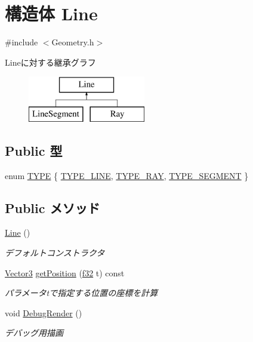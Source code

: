 \hypertarget{struct_line}{\section{構造体 Line}
\label{struct_line}
}


{\ttfamily \#include $<$Geometry.\-h$>$}

Lineに対する継承グラフ\begin{figure}[H]
\begin{center}
\leavevmode
\includegraphics[height=2.000000cm]{d2/d9d/struct_line}
\end{center}
\end{figure}
\subsection*{Public 型}
\begin{DoxyCompactItemize}
\item 
enum \hyperlink{struct_line_a3ccf0fa7d4f1e4b84271568934a65191}{T\-Y\-P\-E} \{ \hyperlink{struct_line_a3ccf0fa7d4f1e4b84271568934a65191abdda39926b9d3ae8c74cd75bf022e4b4}{T\-Y\-P\-E\-\_\-\-L\-I\-N\-E}, 
\hyperlink{struct_line_a3ccf0fa7d4f1e4b84271568934a65191a180d078e39ee948b847638e7e6ca1412}{T\-Y\-P\-E\-\_\-\-R\-A\-Y}, 
\hyperlink{struct_line_a3ccf0fa7d4f1e4b84271568934a65191a132da67b5b3509a5d72a61a664091247}{T\-Y\-P\-E\-\_\-\-S\-E\-G\-M\-E\-N\-T}
 \}
\end{DoxyCompactItemize}
\subsection*{Public メソッド}
\begin{DoxyCompactItemize}
\item 
\hyperlink{struct_line_acc11b8a429d8cdd63ba6803dff5602b3}{Line} ()
\begin{DoxyCompactList}\small\item\em デフォルトコンストラクタ \end{DoxyCompactList}\item 
\hyperlink{struct_vector3}{Vector3} \hyperlink{struct_line_ad1eac3c5d397339f4d2c962a0a1eab72}{get\-Position} (\hyperlink{_main_8h_a5f6906312a689f27d70e9d086649d3fd}{f32} t) const 
\begin{DoxyCompactList}\small\item\em パラメータtで指定する位置の座標を計算 \end{DoxyCompactList}\item 
void \hyperlink{struct_line_a0501a1de160dc2b156282b27f0030651}{Debug\-Render} ()
\begin{DoxyCompactList}\small\item\em デバッグ用描画 \end{DoxyCompactList}\end{DoxyCompactItemize}
